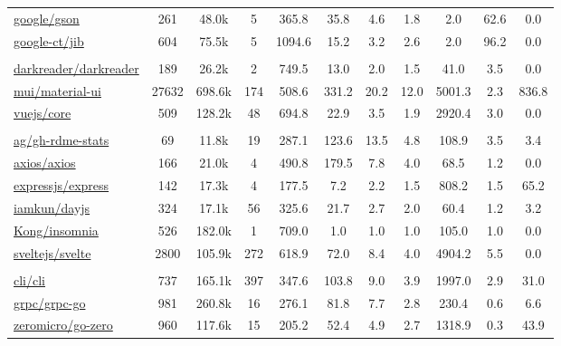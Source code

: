 \documentclass[11pt, a4paper, logo, copyright, nonumbering]{seed}
\begin{document}
\begin{table}[!ht]
{\begin{tabular}{lcc|c|c|ccc|ccc}
\href{https://github.com/google/gson}{google/gson} & 261 & 48.0k & 5 & 365.8 & 35.8 & 4.6 & 1.8 & 2.0 & 62.6 & 0.0 \\ 
\href{https://github.com/googlecontainertools/jib}{google-ct/jib} & 604 & 75.5k & 5 & 1094.6 & 15.2 & 3.2 & 2.6 & 2.0 & 96.2 & 0.0 \\ 
\hline
    \rowcolor{mygray} \multicolumn{11}{c}{TypeScript} \\
\href{https://github.com/darkreader/darkreader}{darkreader/darkreader} & 189 & 26.2k & 2 & 749.5 & 13.0 & 2.0 & 1.5 & 41.0 & 3.5 & 0.0 \\ 
\href{https://github.com/mui/material-ui}{mui/material-ui} & 27632 & 698.6k & 174 & 508.6 & 331.2 & 20.2 & 12.0 & 5001.3 & 2.3 & 836.8 \\ 
\href{https://github.com/vuejs/core}{vuejs/core} & 509 & 128.2k & 48 & 694.8 & 22.9 & 3.5 & 1.9 & 2920.4 & 3.0 & 0.0 \\ 
    \hline
    \rowcolor{mygray} \multicolumn{11}{c}{JavaScript} \\
\href{https://github.com/anuraghazra/github-readme-stats}{ag/gh-rdme-stats} & 69 & 11.8k & 19 & 287.1 & 123.6 & 13.5 & 4.8 & 108.9 & 3.5 & 3.4 \\ 
\href{https://github.com/axios/axios}{axios/axios} & 166 & 21.0k & 4 & 490.8 & 179.5 & 7.8 & 4.0 & 68.5 & 1.2 & 0.0 \\ 
\href{https://github.com/expressjs/express}{expressjs/express} & 142 & 17.3k & 4 & 177.5 & 7.2 & 2.2 & 1.5 & 808.2 & 1.5 & 65.2 \\ 
\href{https://github.com/iamkun/dayjs}{iamkun/dayjs} & 324 & 17.1k & 56 & 325.6 & 21.7 & 2.7 & 2.0 & 60.4 & 1.2 & 3.2 \\ 
\href{https://github.com/Kong/insomnia}{Kong/insomnia} & 526 & 182.0k & 1 & 709.0 & 1.0 & 1.0 & 1.0 & 105.0 & 1.0 & 0.0 \\ 
\href{https://github.com/sveltejs/svelte}{sveltejs/svelte} & 2800 & 105.9k & 272 & 618.9 & 72.0 & 8.4 & 4.0 & 4904.2 & 5.5 & 0.0 \\ 
    \hline
    \rowcolor{mygray} \multicolumn{11}{c}{Go} \\
\href{https://github.com/cli/cli}{cli/cli} & 737 & 165.1k & 397 & 347.6 & 103.8 & 9.0 & 3.9 & 1997.0 & 2.9 & 31.0 \\ 
\href{https://github.com/grpc/grpc-go}{grpc/grpc-go} & 981 & 260.8k & 16 & 276.1 & 81.8 & 7.7 & 2.8 & 230.4 & 0.6 & 6.6 \\ 
\href{https://github.com/zeromicro/go-zero}{zeromicro/go-zero} & 960 & 117.6k & 15 & 205.2 & 52.4 & 4.9 & 2.7 & 1318.9 & 0.3 & 43.9 \\ 

\end{tabular}}
\end{table}
\end{document}

